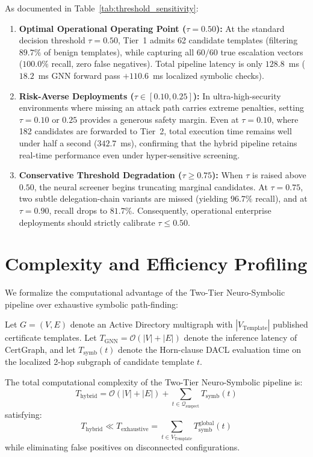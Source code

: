 As documented in Table~\ref{tab:threshold_sensitivity}:
\begin{enumerate}
    \item \textbf{Optimal Operational Operating Point ($\tau = 0.50$):} At the standard decision threshold $\tau = 0.50$, Tier~1 admits 62 candidate templates (filtering $89.7\%$ of benign templates), while capturing all $60/60$ true escalation vectors ($100.0\%$ recall, zero false negatives). Total pipeline latency is only $128.8$~ms ($18.2$~ms GNN forward pass $+ 110.6$~ms localized symbolic checks).
    \item \textbf{Risk-Averse Deployments ($\tau \in [0.10, 0.25]$):} In ultra-high-security environments where missing an attack path carries extreme penalties, setting $\tau = 0.10$ or $0.25$ provides a generous safety margin. Even at $\tau = 0.10$, where 182 candidates are forwarded to Tier~2, total execution time remains well under half a second ($342.7$~ms), confirming that the hybrid pipeline retains real-time performance even under hyper-sensitive screening.
    \item \textbf{Conservative Threshold Degradation ($\tau \ge 0.75$):} When $\tau$ is raised above $0.50$, the neural screener begins truncating marginal candidates. At $\tau = 0.75$, two subtle delegation-chain variants are missed (yielding $96.7\%$ recall), and at $\tau = 0.90$, recall drops to $81.7\%$. Consequently, operational enterprise deployments should strictly calibrate $\tau \le 0.50$.
\end{enumerate}

\section{Complexity and Efficiency Profiling}
We formalize the computational advantage of the Two-Tier Neuro-Symbolic pipeline over exhaustive symbolic path-finding:

\begin{theorem}
Let $G = (V, E)$ denote an Active Directory multigraph with $|V_{\text{Template}}|$ published certificate templates. Let $T_{\text{GNN}} = \mathcal{O}(|V| + |E|)$ denote the inference latency of CertGraph, and let $T_{\text{symb}}(t)$ denote the Horn-clause DACL evaluation time on the localized 2-hop subgraph of candidate template $t$.

The total computational complexity of the Two-Tier Neuro-Symbolic pipeline is:
\begin{equation}
T_{\text{hybrid}} = \mathcal{O}(|V| + |E|) + \sum_{t \in \mathcal{Q}_{\text{suspect}}} T_{\text{symb}}(t)
\end{equation}
satisfying:
\begin{equation}
T_{\text{hybrid}} \ll T_{\text{exhaustive}} = \sum_{t \in V_{\text{Template}}} T_{\text{symb}}^{\text{global}}(t)
\end{equation}
while eliminating false positives on disconnected configurations.
\end{theorem}

